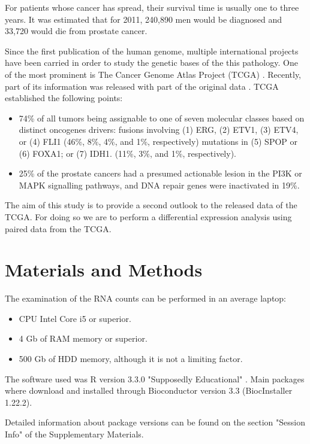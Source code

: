 \documentclass[9pt,twocolumn,twoside]{gsajnl}
\begin{document}
For patients whose cancer has spread, their survival time is usually one to three years. It was estimated that for 2011, 240,890 men would be diagnosed and 33,720 would die from prostate cancer.


Since the first publication of the human genome, multiple international projects have been carried in order to study the genetic bases of the this pathology. One of the most prominent is The Cancer Genome Atlas Project (TCGA) \citep{tgca}. Recently, part of its information was released with part of the original data \cite{Rahman15112015}. TCGA established the following points:

\begin{itemize}
\item 74\% of all tumors being assignable to one of seven molecular classes based on distinct oncogenes drivers:
        fusions involving (1) ERG, (2) ETV1, (3) ETV4, or (4) FLI1 (46\%, 8\%, 4\%, and 1\%, respectively)
        mutations in (5) SPOP or (6) FOXA1; or (7) IDH1. (11\%, 3\%, and 1\%, respectively).
\item 25\% of the prostate cancers had a presumed actionable lesion in the PI3K or MAPK signalling pathways, and DNA repair genes were inactivated in 19\%.
\end{itemize}
   
    
The aim of this study is to provide a second outlook to the released data of the TCGA. For doing so we are to perform a differential expression analysis using paired data from the TCGA.

\section*{Materials and Methods}
The examination of the RNA counts can be performed in an average laptop:
\begin{itemize}
\item CPU Intel Core i5 or superior.
\item 4 Gb of RAM memory or superior.
\item 500 Gb of HDD memory, although it is not a limiting factor.
\end{itemize}

The software used was R version 3.3.0 "Supposedly Educational" \cite{R}. Main packages where download and installed through Bioconductor version 3.3 (BiocInstaller 1.22.2)\cite{bioconductor}.

Detailed information about package versions can be found on the section "Session Info" of the Supplementary Materials.
\end{document}
